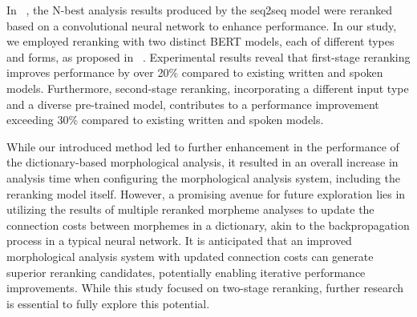 \documentclass[AMS,STIX2COL]{WileyNJD-v2}
\begin{document}
    In ~\cite{ChoiYS2018}, the N-best analysis results produced by the seq2seq model were reranked based on a convolutional neural network to enhance performance.
    In our study, we employed reranking with two distinct BERT models, each of different types and forms, as proposed in ~\cite{Nogueira2019}.
    Experimental results reveal that first-stage reranking improves performance by over 20\% compared to existing written and spoken models.
    Furthermore, second-stage reranking, incorporating a different input type and a diverse pre-trained model, contributes to a performance improvement exceeding 30\% compared to existing written and spoken models.

    While our introduced method led to further enhancement in the performance of the dictionary-based morphological analysis, it resulted in an overall increase in analysis time when configuring the morphological analysis system, including the reranking model itself.
    However, a promising avenue for future exploration lies in utilizing the results of multiple reranked morpheme analyses to update the connection costs between morphemes in a dictionary, akin to the backpropagation process in a typical neural network.
    It is anticipated that an improved morphological analysis system with updated connection costs can generate superior reranking candidates, potentially enabling iterative performance improvements.
    While this study focused on two-stage reranking, further research is essential to fully explore this potential.
\end{document}
